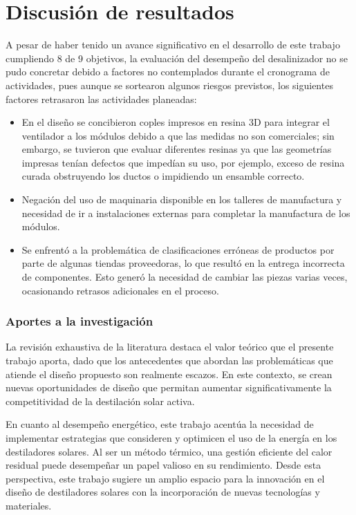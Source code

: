 \chapter{Discusión de resultados}

	A pesar de haber tenido un avance significativo en el desarrollo de este trabajo cumpliendo 8 de 9 objetivos, la evaluación del desempeño del desalinizador no se pudo concretar debido a factores no contemplados durante el cronograma de actividades, pues aunque se sortearon algunos riesgos previstos, los siguientes factores retrasaron las actividades planeadas:
	
	\begin{itemize}
		\item En el diseño se concibieron coples impresos en resina 3D para integrar el ventilador a los módulos debido a que las medidas no son comerciales; sin embargo, se tuvieron que evaluar diferentes resinas ya que las geometrías impresas tenían defectos que impedían su uso, por ejemplo, exceso de resina curada obstruyendo los ductos o impidiendo un ensamble correcto.
		\item Negación del uso de maquinaria disponible en los talleres de manufactura y necesidad de ir a instalaciones externas para completar la manufactura de los módulos.
		\item Se enfrentó a la problemática de clasificaciones erróneas de productos por parte de algunas tiendas proveedoras, lo que resultó en la entrega incorrecta de componentes. Esto generó la necesidad de cambiar las piezas varias veces, ocasionando retrasos adicionales en el proceso.
	\end{itemize}
	
	\subsection{Aportes a la investigación}
	
		La revisión exhaustiva de la literatura destaca el valor teórico que el presente trabajo aporta, dado que los antecedentes que abordan las problemáticas que atiende el diseño propuesto son realmente escazos. En este contexto, se crean nuevas oportunidades de diseño que permitan aumentar significativamente la competitividad de la destilación solar activa.
		
		En cuanto al desempeño energético, este trabajo acentúa la necesidad de implementar estrategias que consideren y optimicen el uso de la energía en los destiladores solares. Al ser un método térmico, una gestión eficiente del calor residual puede desempeñar un papel valioso en su rendimiento. Desde esta perspectiva, este trabajo sugiere un amplio espacio para la innovación en el diseño de destiladores solares con la incorporación de nuevas tecnologías y materiales. 
		
